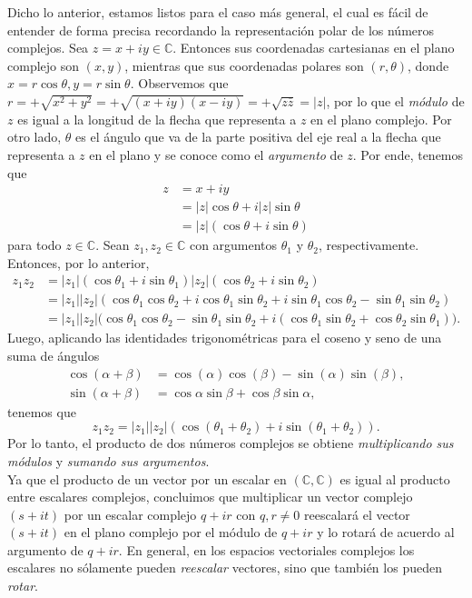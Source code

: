 \documentclass[apuntes]{subfiles}
\begin{document}
   Dicho lo anterior, estamos listos para el caso más general, el cual es fácil de entender de forma precisa recordando la representación polar de los números complejos. Sea $z=x+iy\in\mathbb{C}$. Entonces sus coordenadas cartesianas en el plano complejo son $(x,y)$, mientras que sus coordenadas polares son $(r,\theta)$, donde $x=r\cos\theta, y = r\sin\theta$. Observemos que $r = +\sqrt{x^2+y^2} = +\sqrt{(x+iy)(x-iy)} = +\sqrt{z \overline{z}} = |z|$, por lo que el \emph{módulo} de $z$ es igual a la longitud de la flecha que representa a $z$ en el plano complejo. Por otro lado, $\theta$ es el ángulo que va de la parte positiva del eje real a la flecha que representa a $z$ en el plano y se conoce como el \emph{argumento} de $z$. Por ende, tenemos que
   \begin{align*}
       z &= x+iy \\
         &= |z|\cos\theta + i|z|\sin\theta \\
         &= |z|(\cos\theta+i\sin\theta)
   \end{align*}
   para todo $z\in\mathbb{C}$. Sean $z_1,z_2\in\mathbb{C}$ con argumentos $\theta_1$ y $\theta_2$, respectivamente. Entonces, por lo anterior,
   \begin{align*}
       z_1z_2 &= |z_1|(\cos\theta_1+i\sin\theta_1)|z_2|(\cos\theta_2+i\sin\theta_2) \\
              &= |z_1||z_2|(\cos\theta_1\cos\theta_2 +i\cos\theta_1\sin\theta_2 + i\sin\theta_1\cos\theta_2-\sin\theta_1\sin\theta_2) \\
              &= |z_1||z_2|\big(\cos\theta_1\cos\theta_2 -\sin\theta_1\sin\theta_2 + i(\cos\theta_1\sin\theta_2+\cos\theta_2\sin\theta_1)\big).
   \end{align*}
   Luego, aplicando las identidades trigonométricas para el coseno y seno de una suma de ángulos
   \begin{align*}
       \cos(\alpha+\beta) &= \cos(\alpha)\cos(\beta)-\sin(\alpha)\sin(\beta), \\
       \sin(\alpha+\beta) &= \cos\alpha\sin\beta + \cos\beta\sin\alpha,
   \end{align*}
   tenemos que
   \[
   z_1z_2 = |z_1||z_2|(\cos(\theta_1+\theta_2) + i\sin(\theta_1+\theta_2)).
   \] 
   Por lo tanto, el producto de dos números complejos se obtiene \emph{multiplicando sus módulos} y \emph{sumando sus argumentos}. \\

   Ya que el producto de un vector por un escalar en $(\mathbb{C},\mathbb{C})$ es igual al producto entre escalares complejos, concluimos que multiplicar un vector complejo $(s+it)$ por un escalar complejo $q+ir$ con $q,r\neq0$ reescalará el vector $(s+it)$ en el plano complejo por el módulo de $q+ir$ y lo rotará de acuerdo al argumento de $q+ir$. En general, en los espacios vectoriales complejos los escalares no sólamente pueden \emph{reescalar} vectores, sino que también los pueden \emph{rotar}. 
\end{document}
